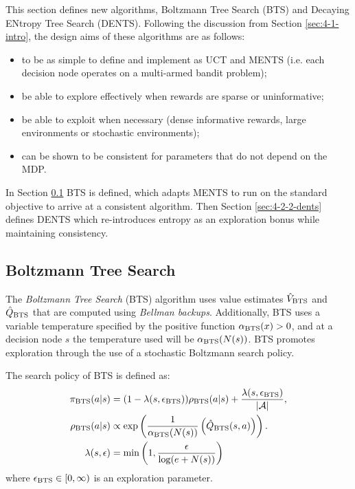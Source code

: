     This section defines new algorithms, Boltzmann Tree Search (BTS) and Decaying ENtropy Tree Search (DENTS). Following the discussion from Section \ref{sec:4-1-intro}, the design aims of these algorithms are as follows:
    \begin{itemize}
        \item to be as simple to define and implement as UCT and MENTS (i.e. each decision node operates on a multi-armed bandit problem);
        \item be able to explore effectively when rewards are sparse or uninformative;
        \item be able to exploit when necessary (dense informative rewards, large environments or stochastic environments);
        \item can be shown to be consistent for parameters that do not depend on the MDP.
    \end{itemize}

    In Section \ref{sec:4-2-1-bts} BTS is defined, which adapts MENTS to run on the standard objective to arrive at a consistent algorithm. Then Section \ref{sec:4-2-2-dents} defines DENTS which re-introduces entropy as an exploration bonus while maintaining consistency.



    
    \subsection{Boltzmann Tree Search}
    \label{sec:4-2-1-bts}

        The \textit{Boltzmann Tree Search} (BTS) algorithm uses value estimates ${\hat{V}_{{\textnormal{BTS}}}}$ and ${\hat{Q}_{{\textnormal{BTS}}}}$ that are computed using \textit{Bellman backups}. Additionally, BTS uses a variable temperature specified by the positive function ${\alpha_{{\textnormal{BTS}}}}(x)>0$, and at a decision node $s$ the temperature used will be ${\alpha_{{\textnormal{BTS}}}}(N(s))$. BTS promotes exploration through the use of a stochastic Boltzmann search policy.
        
        The search policy of BTS is defined as: 
        \begin{align}
            {\pi_{{\textnormal{BTS}}}}(a|s) &= (1-{\lambda(s,{\epsilon_{{\textnormal{BTS}}}})}){\rho_{{\textnormal{BTS}}}}(a|s) + \frac{{\lambda(s,{\epsilon_{{\textnormal{BTS}}}})}}{|\mathcal{A}|}, 
                        \label{eq:4:bts_search_policy} \\ 
            {\rho_{{\textnormal{BTS}}}}(a|s) &\propto \exp\left(\frac{1}{{\alpha_{{\textnormal{BTS}}}}(N(s))}\left({\hat{Q}_{{\textnormal{BTS}}}}(s,a)\right)\right).
                        \label{eq:4:bts_value_policy} \\
            \lambda(s,\epsilon) &= \min\left(1, \frac{\epsilon}{\log(e+N(s))}\right) \label{eq:4:lambda}
        \end{align}
        where ${\epsilon_{{\textnormal{BTS}}}} \in [0,\infty)$ is an exploration parameter. %
        
